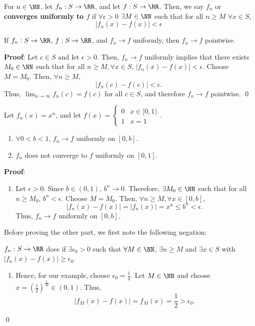 \begin{definition}
For $n\in \NN$, let $f_n:S\to \RR$, and let $f:S\to \RR$. Then, we say $f_n$  or \textbf{converges uniformly to $f$} if $\forall \epsilon>0$ $\exists M\in \NN$ such that for all $n\geq M$ $\forall x\in S$,
\[
|f_n(x) - f(x)|<\epsilon
\]
\end{definition}

\begin{theorem}
If $f_n:S\to \RR$, $f:S\to \RR$, and $f_n\to f$ uniformly, then $f_n\to f$ pointwise.
\end{theorem}
\textbf{Proof}: Let $c\in S$ and let $\epsilon>0$. Then, $f_n\to f$ uniformly implies that there exists $M_0\in \NN$ such that for all $n\geq M, \forall x\in S$, $|f_n(x)-f(x)|<\epsilon$. Choose $M=M_0$. Then, $\forall n\geq M$, 
\[
|f_n(c) - f(c)|< \epsilon.
\]
Thus, $\lim_{n\to \infty}f_n(c) = f(c)$ for all $c\in S$, and therefore $f_n\to f$ pointwise. \qed


\begin{theorem}
Let $f_n(x) = x^n$, and let $f(x) = \begin{cases}0&x\in [0,1) \\ 1& x=1\end{cases}.$ 
\begin{enumerate}
    \item $\forall 0 < b<1$, $f_n\to f$ uniformly on $[0,b]$.
    \item $f_n$ does not converge to $f$ uniformly on $[0,1]$.
\end{enumerate}
\end{theorem}
\textbf{Proof}:
\begin{enumerate}
    \item Let $\epsilon>0$. Since $b\in (0,1)$, $b^n \to 0$. Therefore, $\exists M_0\in \NN$ such that for all $n\geq M_0$, $b^n < \epsilon$. Choose $M = M_0$. Then, $\forall n\geq M, \forall x\in [0,b]$,
    \[
    |f_n(x) - f(x)| = |f_n(x)| = x^n \leq b^n<\epsilon.
    \]
    Thus, $f_n\to f$ uniformly on $[0,b]$.
\end{enumerate}
Before proving the other part, we first note the following negation:
\begin{negation}
$f_n:S\to \RR$ does  if $\exists \epsilon_0>0$ such that $\forall M\in\NN$, $\exists n\geq M$ and $\exists x\in S$ with $|f_n(x) - f(x)|\geq \epsilon_0$.
\end{negation}
\begin{enumerate}
    \item[2.] Hence, for our example, choose $\epsilon_0 = \frac{1}{4}$. Let $M\in\NN$ and choose $x = \left(\frac{1}{2}\right)^{\frac{1}{M}}\in (0,1)$. Thus, 
    \[
    |f_M(x) - f(x)| = f_M(x) = \frac{1}{2} >\epsilon_0.
    \]
\end{enumerate}
\qed 

